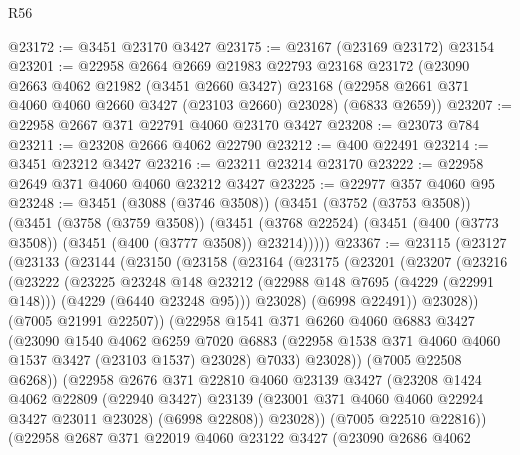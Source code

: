 \begin{lexlean}{R56}
\begin{coremodule}
@23172 := @3451 @23170 @3427
@23175 := @23167 (@23169 @23172) @23154
@23201 := @22958
    @2664
    @2669
    @21983
    @22793
    @23168
    @23172
    (@23090
      @2663
      @4062
      @21982
      (@3451 @2660 @3427)
      @23168
      (@22958 @2661 @371 @4060 @4060 @2660 @3427 (@23103 @2660) @23028)
      (@6833 @2659))
@23207 := @22958 @2667 @371 @22791 @4060 @23170 @3427
@23208 := @23073 @784
@23211 := @23208 @2666 @4062 @22790
@23212 := @400 @22491
@23214 := @3451 @23212 @3427
@23216 := @23211 @23214 @23170
@23222 := @22958 @2649 @371 @4060 @4060 @23212 @3427
@23225 := @22977 @357 @4060 @95
@23248 := @3451
    (@3088 (@3746 @3508))
    (@3451
      (@3752 (@3753 @3508))
      (@3451
        (@3758 (@3759 @3508))
        (@3451 (@3768 @22524) (@3451 (@400 (@3773 @3508)) (@3451 (@400 (@3777 @3508)) @23214)))))
@23367 := @23115
    (@23127
      (@23133
        (@23144
          (@23150
            (@23158
              (@23164
                (@23175
                  (@23201
                    (@23207
                      (@23216
                        (@23222
                          (@23225
                            @23248
                            @148
                            @23212
                            (@22988 @148 @7695 (@4229 (@22991 @148)))
                            (@4229 (@6440 @23248 @95)))
                          @23028)
                        (@6998 @22491))
                      @23028))
                  (@7005 @21991 @22507))
                (@22958
                  @1541
                  @371
                  @6260
                  @4060
                  @6883
                  @3427
                  (@23090
                    @1540
                    @4062
                    @6259
                    @7020
                    @6883
                    (@22958 @1538 @371 @4060 @4060 @1537 @3427 (@23103 @1537) @23028)
                    @7033)
                  @23028))
              (@7005 @22508 @6268))
            (@22958
              @2676
              @371
              @22810
              @4060
              @23139
              @3427
              (@23208
                @1424
                @4062
                @22809
                (@22940 @3427)
                @23139
                (@23001 @371 @4060 @4060 @22924 @3427 @23011 @23028)
                (@6998 @22808))
              @23028))
          (@7005 @22510 @22816))
        (@22958
          @2687
          @371
          @22019
          @4060
          @23122
          @3427
          (@23090
            @2686
            @4062

\end{coremodule}
\end{lexlean}
